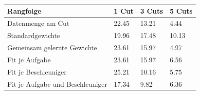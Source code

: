 \begin{tabular}{@{}llll@{}}
\toprule
Rangfolge & 1 Cut & 3 Cuts & 5 Cuts \\
\midrule
Datenmenge am Cut & 22.45 & 13.21 & 4.44 \\
Standardgewichte & 19.96 & 17.48 & 10.13 \\
Gemeinsam gelernte Gewichte & 23.61 & 15.97 & 4.97 \\
Fit je Aufgabe & 23.61 & 15.97 & 6.56 \\
Fit je Beschleuniger & 25.21 & 10.16 & 5.75 \\
Fit je Aufgabe und Beschleuniger & 17.34 & 9.82 & 6.36 \\
\bottomrule
\end{tabular}
